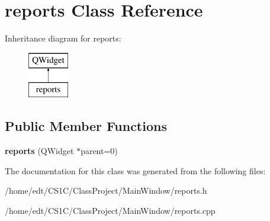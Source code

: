 \hypertarget{classreports}{\section{reports Class Reference}
\label{classreports}
}
Inheritance diagram for reports\-:\begin{figure}[H]
\begin{center}
\leavevmode
\includegraphics[height=2.000000cm]{classreports}
\end{center}
\end{figure}
\subsection*{Public Member Functions}
\begin{DoxyCompactItemize}
\item 
\hypertarget{classreports_aa1efd01d6a2a715cad88423fac7380f6}{{\bfseries reports} (Q\-Widget $\ast$parent=0)}\label{classreports_aa1efd01d6a2a715cad88423fac7380f6}

\end{DoxyCompactItemize}


The documentation for this class was generated from the following files\-:\begin{DoxyCompactItemize}
\item 
/home/edt/\-C\-S1\-C/\-Class\-Project/\-Main\-Window/reports.\-h\item 
/home/edt/\-C\-S1\-C/\-Class\-Project/\-Main\-Window/reports.\-cpp\end{DoxyCompactItemize}
